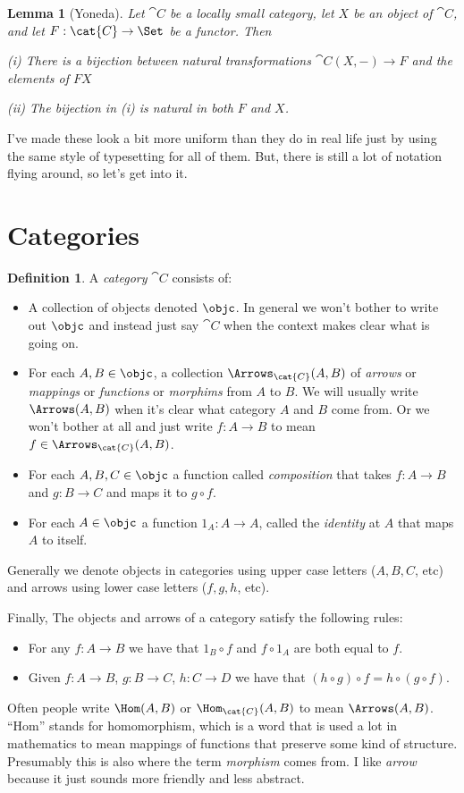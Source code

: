 \documentclass[12pt]{article}
\newtheorem{lemma}[thm]{Lemma}
\theoremstyle{definition}
\newtheorem{defn}{Definition}[]
\theoremstyle{remark}
\numberwithin{equation}{section}
\begin{document}
\begin{lemma}[Yoneda]\label{yoneda5}
Let $\cat{C}$ be a locally small category, let $X$ be an object of $\cat{C}$, and let $F: \cat{C} \to \Set$ be a functor. Then

(i) There is a bijection between natural transformations $\cat{C}(X, -) \to F$ and the elements of $FX$

(ii) The bijection in (i) is natural in both $F$ and $X$.
\end{lemma}

\noindent
I've made these look a bit more uniform than they do in real life just by using the same style of typesetting for all of them. But, there is still a lot of notation flying around, so let's get into it.

\section{Categories}

\begin{defn}
A {\it category}%
%
%
$\cat{C}$ consists of:
% 
\begin{itemize}
\item 
A collection of objects denoted $\objc$. In general we won't bother to write out $\objc$
and instead just say $\cat{C}$ when the context makes clear what is going on.
\item 
For each $A, B \in \objc$, a collection $\Arrows_{\cat{C}}(A, B)$%
of {\it arrows} or {\it mappings} or {\it functions} or {\it morphims} from $A$ to $B$. We will usually write $\Arrows(A,B)$ when it's clear what category $A$ and $B$ come from. Or we won't bother at all and just write $f: A \to B$ to mean $f \in \Arrows_{\cat{C}}(A,B)$.
\item
For each $A, B, C \in \objc$ a function called {\it composition} that takes $f:A \to B$ and $g : B \to C$ and maps it to $g \circ f$.
\item
For each $A \in \objc$ a function $1_A: A \to A$, called the {\it identity} at $A$ that
maps $A$ to itself. \end{itemize}%
Generally we denote objects in categories using upper case letters ($A, B,C$, etc) and
arrows using lower case letters ($f, g, h$, etc).

Finally, The objects and arrows of a category satisfy the following rules:
\begin{itemize}
\item For any $f: A \to B$ we have that  $1_B \circ f$ and $f \circ 1_A$ are both equal to $f$.
\item Given $f: A \to B$, $g: B \to C$, $h: C\to D$ we have that $(h \circ g) \circ f = h \circ (g \circ f)$.%
\end{itemize}%
\end{defn}%
\noindent
Often people write $\Hom(A, B)$ or $\Hom_{\cat{C}}(A,B)$ to mean $\Arrows(A,B)$. ``Hom'' stands for homomorphism, which is a word that is used a lot in mathematics to mean mappings of functions that preserve some kind of structure. Presumably this is also where the term {\it morphism} comes from. I like {\it arrow} because it just sounds more friendly and less abstract.
\end{document}
